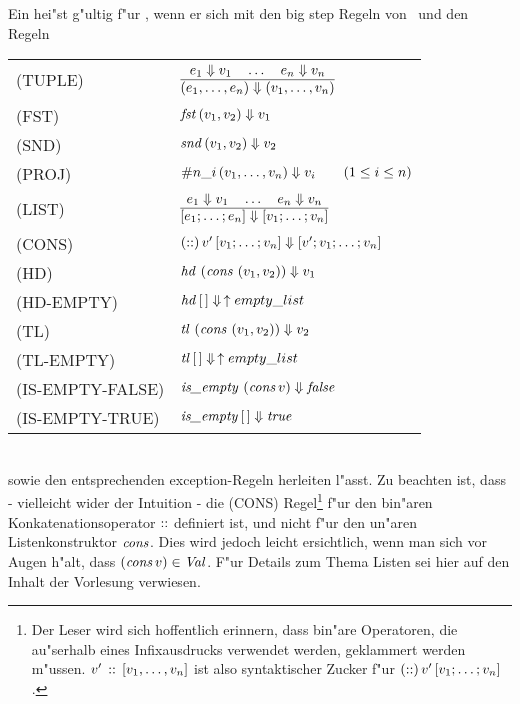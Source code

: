 Ein  hei"st g"ultig f"ur \LTHREE, wenn er sich mit den big step Regeln von \LTWO\ und den Regeln\\[5mm]
  \begin{tabular}{ll}
    \mbox{(TUPLE)}          & $\regel{e_1 \eval v_1 \quad \ldots \quad e_n \eval v_n}
                                     {(e_1,\ldots,e_n) \eval (v_1,\ldots,v_n)}$ \\[5mm]
    \mbox{(FST)}            & ${\text{\it fst\/}}\,(v_1,v_2) \Downarrow v_1$ \\[3mm]
    \mbox{(SND)}            & ${\text{\it snd\/}}\,(v_1,v_2) \Downarrow v_2$ \\[3mm]
    \mbox{(PROJ)}           & $\#n\_i\,(v_1,\ldots,v_n) \Downarrow v_i \qquad (1 \le i \le n)$ \\[3mm]
    \mbox{(LIST)}           & $\regel{e_1 \eval v_1 \quad \ldots \quad e_n \eval v_n}
                                     {[e_1;\ldots;e_n] \eval [v_1;\ldots;v_n]}$ \\[5mm]
    \mbox{(CONS)}           & $(\mathrel{::})\,v'\,[v_1;\ldots;v_n] \Downarrow [v';v_1;\ldots;v_n]$ \\[3mm]
    \mbox{(HD)}             & ${\text{\it hd\/}}\,\left({\text{\it cons\/}}\,\left(v_1,v_2\right)\right) \Downarrow v_1$ \\[3mm]
    \mbox{(HD-EMPTY)}       & ${\text{\it hd\/}}\,[\,] \Downarrow\,\uparrow empty\_list$ \\[3mm]
    \mbox{(TL)}             & ${\text{\it tl\/}}\,\left({\text{\it cons\/}}\,\left(v_1,v_2\right)\right) \Downarrow v_2$ \\[3mm]
    \mbox{(TL-EMPTY)}       & ${\text{\it tl\/}}\,[\,] \Downarrow\,\uparrow empty\_list$ \\[3mm]
    \mbox{(IS-EMPTY-FALSE)} & ${\text{\it is\_empty\/}}\,\left({\text{\it cons\/}}\,v\right) \Downarrow {\text{\it false\/}}$ \\[3mm]
    \mbox{(IS-EMPTY-TRUE)}  & ${\text{\it is\_empty\/}}\,[\,] \Downarrow {\text{\it true\/}}$
  \end{tabular}\\[7mm]
sowie den entsprechenden exception-Regeln herleiten l"asst. Zu beachten ist, dass - vielleicht wider der Intuition - die
(CONS) Regel\footnote{Der Leser wird sich hoffentlich erinnern, dass bin"are Operatoren, die au"serhalb eines Infixausdrucks
verwendet werden, geklammert werden m"ussen. $v'\,\mathrel{::}\,[v_1,\ldots,v_n]$ ist also syntaktischer Zucker f"ur
$(\mathrel{::})\,v'\,[v_1;\ldots;v_n]$.} f"ur den bin"aren Konkatenationsoperator $\mathrel{::}$ definiert ist, und nicht f"ur den
un"aren Listenkonstruktor ${\text{\it cons\/}}$. Dies wird jedoch leicht ersichtlich, wenn man sich vor Augen h"alt, dass $({\text{\it cons\/}}\,v) \in {\text{\it Val\/}}$.
F"ur Details zum Thema Listen sei hier auf den Inhalt der Vorlesung verwiesen.



